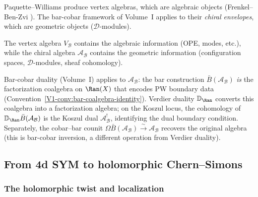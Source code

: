 \begin{remark}\label{rem:PW-connection}
Paquette--Williams produce vertex algebras, which are algebraic objects (Frenkel--Ben-Zvi
\cite{FBZ04}). The bar-cobar framework of Volume~I applies to their \emph{chiral envelopes}, which are
geometric objects ($\mathcal{D}$-modules).

\begin{center}
\end{center}

The vertex algebra $V_{\mathcal{B}}$ contains the algebraic information (OPE, modes,
etc.), while the chiral algebra $\mathcal{A}_{\mathcal{B}}$ contains the geometric
information (configuration spaces, $\mathcal{D}$-modules, sheaf cohomology).

Bar-cobar duality (Volume~I) applies to $\mathcal{A}_{\mathcal{B}}$: the bar construction $\bar{B}(\mathcal{A}_{\mathcal{B}})$ \emph{is} the factorization coalgebra on $\Ran(X)$ that encodes PW boundary data (Convention~\ref*{V1-conv:bar-coalgebra-identity}). Verdier duality $\mathbb{D}_{\Ran}$ converts this coalgebra into a factorization algebra; on the Koszul locus, the cohomology of $\mathbb{D}_{\Ran}\bar{B}(\mathcal{A}_{\mathcal{B}})$ is the Koszul dual $\mathcal{A}_{\mathcal{B}}^!$, identifying the dual boundary condition. Separately, the cobar--bar counit $\Omega\bar{B}(\mathcal{A}_{\mathcal{B}}) \xrightarrow{\sim} \mathcal{A}_{\mathcal{B}}$ recovers the original algebra (this is bar-cobar inversion, a different operation from Verdier duality).
\end{remark}

\subsection{From 4d SYM to holomorphic Chern--Simons}

\subsubsection{The holomorphic twist and localization}

